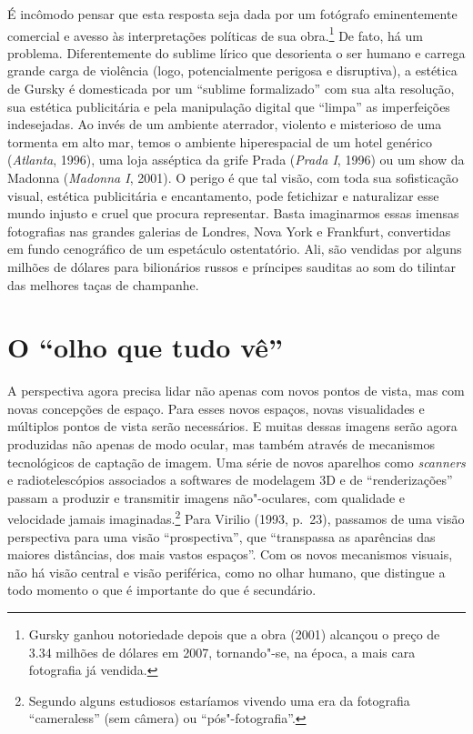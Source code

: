 É incômodo pensar que esta resposta seja dada por um fotógrafo
eminentemente comercial e avesso às interpretações políticas de sua
obra.\footnote{Gursky ganhou notoriedade depois que a obra {} (2001) alcançou o preço de 3.34 milhões de dólares em
  2007, tornando"-se, na época, a mais cara fotografia já vendida.} De
fato, há um problema. Diferentemente do sublime lírico que desorienta o
ser humano e carrega grande carga de violência (logo, potencialmente
perigosa e disruptiva), a estética de Gursky é domesticada por um
``sublime formalizado'' com sua alta resolução, sua estética
publicitária e pela manipulação digital que ``limpa'' as imperfeições
indesejadas. Ao invés de um ambiente aterrador, violento e misterioso de
uma tormenta em alto mar, temos o ambiente hiperespacial de um hotel
genérico (\emph{Atlanta}, 1996), uma loja asséptica da grife Prada
(\emph{Prada I}, 1996) ou um show da Madonna (\emph{Madonna I}, 2001). O
perigo é que tal visão, com toda sua sofisticação visual, estética
publicitária e encantamento, pode fetichizar e naturalizar esse mundo
injusto e cruel que procura representar. Basta imaginarmos essas imensas
fotografias nas grandes galerias de Londres, Nova York e Frankfurt,
convertidas em fundo cenográfico de um espetáculo ostentatório. Ali, são
vendidas por alguns milhões de dólares para bilionários russos e
príncipes sauditas ao som do tilintar das melhores taças de champanhe.

\chapter{O ``olho que tudo vê''}

A perspectiva agora precisa lidar não apenas com novos pontos de vista,
mas com novas concepções de espaço. Para esses novos espaços, novas
visualidades e múltiplos pontos de vista serão necessários. E muitas
dessas imagens serão agora produzidas não apenas de modo ocular, mas
também através de mecanismos tecnológicos de captação de imagem. Uma
série de novos aparelhos como \emph{scanners} e radiotelescópios associados a
softwares de modelagem 3D e de ``renderizações'' passam a produzir e
transmitir imagens não"-oculares, com qualidade e velocidade jamais
imaginadas.\footnote{Segundo alguns estudiosos estaríamos vivendo uma
  era da fotografia ``cameraless'' (sem câmera) ou
  ``pós"-fotografia''.} Para Virilio (1993, p.~23), passamos de uma visão
perspectiva para uma visão ``prospectiva'', que ``transpassa as
aparências das maiores distâncias, dos mais vastos espaços''. Com os
novos mecanismos visuais, não há visão central e visão periférica, como
no olhar humano, que distingue a todo momento o que é importante do que
é secundário.

